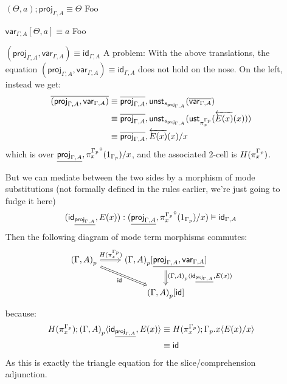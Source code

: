 \documentclass[10pt]{article}
\theoremstyle{definition}
\newcommand{\rewrite}[2]{\overleftarrow{#1}(#2)}
\newcommand\UStI[2]{\ensuremath{\mathsf{ust}_{#1}(#2)}}
\newcommand\UnSt[2]{\ensuremath{\mathsf{unst}_{#1}(#2)}}
\newcommand\TrCirc[2]{\ensuremath{{#1}^\circ(#2)}}
\newcommand\proj[1]{\ensuremath{\mathsf{proj}_{#1}}}
\newcommand\var[1]{\ensuremath{\mathsf{var}_{#1}}}
\newcommand{\id}{\mathsf{id}}
\newcommand\ap[2]{\ensuremath{#1 \langle #2 \rangle }}
\begin{document}
\begin{enumerate}[style = multiline, labelwidth = 80pt]
\item[{$(\Theta, a);\proj{\Gamma,A} \equiv \Theta$}] Foo
\item[{$\var{\Gamma,A}[\Theta, a] \equiv a$}] Foo
\item[{$(\proj{\Gamma,A}, \var{\Gamma,A}) \equiv \id_{\Gamma, A}$}] 
A problem: With the above translations, the equation $(\proj{\Gamma,A}, \var{\Gamma,A}) \equiv \id_{\Gamma, A}$ does not hold on the nose. On the left, instead we get:
\begin{align*}
\upstairs{(\proj{\Gamma,A}, \var{\Gamma,A})}
&\equiv \upstairs{\proj{\Gamma, A}} , \UnSt{s_{\proj{\Gamma, A}}}{\upstairs{\var{\Gamma, A}}} \\
&\equiv \upstairs{\proj{\Gamma, A}} , \UnSt{s_{\proj{\Gamma, A}}}{\UStI{\pi^{\asdep{\Gamma}}_x}{\rewrite{E(x)}{x}}} \\
&\equiv \upstairs{\proj{\Gamma, A}} , \rewrite{E(x)}{x} / x
\end{align*}
which is over $\downstairs{\proj{\Gamma, A}} , \TrCirc{\pi^{\asdep{\Gamma}}_x}{1_{\asdep{\Gamma}}} / x$, and the associated 2-cell is $H(\pi^{{\Gamma}_p}_x)$.

But we can mediate between the two sides by a morphism of mode substitutions (not formally defined in the rules earlier, we're just going to fudge it here)
 \[(\id_{\downstairs{\proj{\Gamma, A}} }, E(x))  : (\downstairs{\proj{\Gamma, A}} , \TrCirc{\pi^{\asdep{\Gamma}}_x}{1_{\asdep{\Gamma}}} / x) \vDash \id_{\Gamma, A}\]
Then the following diagram of mode term morphisms commutes:
\[\begin{tikzcd}
\asdep{(\Gamma, A)} \ar[r, Rightarrow, "H(\pi^{\asdep{\Gamma}}_x)"] \ar[dr, Rightarrow, "\id" swap] & \asdep{(\Gamma, A)}[\downstairs{\proj{\Gamma,A}, \var{\Gamma,A}}] \ar[d, Rightarrow, "{\ap{\asdep{(\Gamma, A)}}{\id_{\downstairs{\proj{\Gamma, A}} }, E(x)}}"]\\
& \asdep{(\Gamma, A)}[\id]
\end{tikzcd}\]
because:
\begin{align*}
H(\pi^{\asdep{\Gamma}}_x) ; {\ap{\asdep{(\Gamma, A)}}{\id_{\downstairs{\proj{\Gamma, A}} }, E(x)}}
&\equiv H(\pi^{\asdep{\Gamma}}_x) ; {\ap{\asdep{\Gamma}.x}{E(x)/x}} \\
&\equiv \id
\end{align*}
As this is exactly the triangle equation for the slice/comprehension adjunction.


\end{enumerate}
\end{document}
